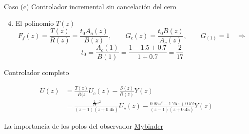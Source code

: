 \documentclass[presentation,aspectratio=169]{beamer}
\begin{document}
\begin{frame}[label={sec:org332aab3}]{Caso (c) Controlador incremental sin cancelación del cero}
\begin{enumerate}
\setcounter{enumi}{3}
\item \alert{El polinomio \(T(z)\)}  \[F_f(z) = \frac{T(z)}{R(z)} = \frac{t_0 A_o(z)}{B(z)}, \qquad G_c(z) = \frac{t_0 B(z)}{A_c(z)}, \qquad G_(1) = 1 \quad\Rightarrow \]
\alert{\[ t_0 = \frac{A_c(1)}{B(1)} = \frac{1 - 1.5 + 0.7}{1+0.7} = \frac{2}{17}\]}
\end{enumerate}

Controlador completo

\begin{align*}
U(z) &= \frac{T(z)}{R(z}U_c(z) - \frac{S(z)}{R(z)}Y(z) \\
     &= \frac{\frac{2}{17}z^2}{(z-1)(z+0.45)}U_c(z) - \frac{0.85z^2 - 1.25z + 0.52}{(z-1)(z+0.45)} Y(z)
     \end{align*}
\end{frame}

\begin{frame}[label={sec:orgda48ef9}]{La importancia de los polos del observador}
\href{https://mybinder.org/v2/gh/kjartan-at-tec/mr2007-computerized-control/master?filepath=.\%2Fpolynomal-design/notebooks/A-and-W-5.3.ipynb}{Mybinder}
\end{frame}
\end{document}
